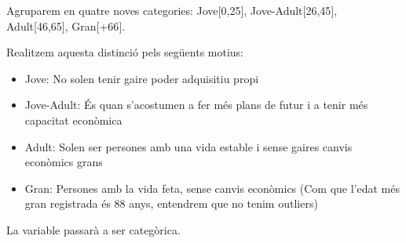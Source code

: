 \documentclass[
]{article}
\newenvironment{Shaded}{\begin{snugshade}}{\end{snugshade}}
\newcommand{\AttributeTok}[1]{\textcolor[rgb]{0.77,0.63,0.00}{#1}}
\newcommand{\DecValTok}[1]{\textcolor[rgb]{0.00,0.00,0.81}{#1}}
\newcommand{\FunctionTok}[1]{\textcolor[rgb]{0.00,0.00,0.00}{#1}}
\newcommand{\NormalTok}[1]{#1}
\newcommand{\OtherTok}[1]{\textcolor[rgb]{0.56,0.35,0.01}{#1}}
\newcommand{\SpecialCharTok}[1]{\textcolor[rgb]{0.00,0.00,0.00}{#1}}
\newcommand{\StringTok}[1]{\textcolor[rgb]{0.31,0.60,0.02}{#1}}
\begin{document}
Agruparem en quatre noves categories: Jove{[}0,25{]},
Jove-Adult{[}26,45{]}, Adult{[}46,65{]}, Gran{[}+66{]}.

Realitzem aquesta distinció pels següents motius:

\begin{itemize}
\item
  Jove: No solen tenir gaire poder adquisitiu propi
\item
  Jove-Adult: És quan s'acostumen a fer més plans de futur i a tenir més
  capacitat econòmica
\item
  Adult: Solen ser persones amb una vida estable i sense gaires canvis
  econòmics grans
\item
  Gran: Persones amb la vida feta, sense canvis econòmics (Com que
  l'edat més gran registrada és 88 anys, entendrem que no tenim
  outliers)
\end{itemize}

La variable passarà a ser categòrica.

\begin{Shaded}
\end{Shaded}

\begin{Shaded}
\end{Shaded}
\end{document}
